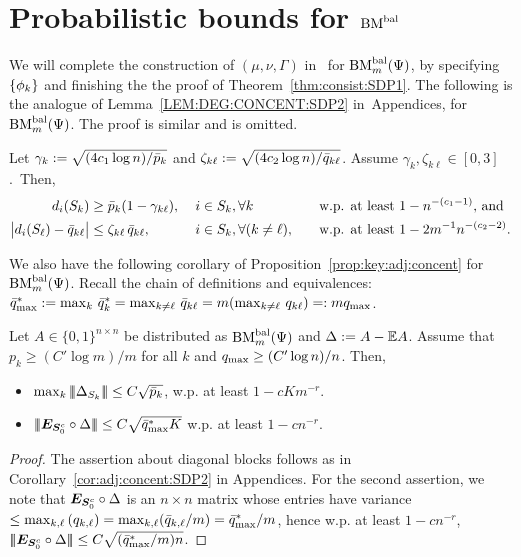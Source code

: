 
\section{Probabilistic bounds for $\textrm{BM}^{\textrm{bal}}$}\label{sec:prob:cond:bm}
  We will complete the construction of $(\mu,\nu,\Gamma)$ in~ for $\textrm{BM}^{\textrm{bal}}_m(\Psi)$, by specifying $\{\phi_k\}$ and finishing the the proof of Theorem~\ref{thm:consist:SDP1}. The following is the analogue of Lemma~\ref{LEM:DEG:CONCENT:SDP2} in~Appendices, for $\textrm{BM}^{\textrm{bal}}_m(\Psi)$. The proof is similar and is omitted.
  \begin{lem}\label{lem:deg:concent:SDP1}
  Let $\gamma_k := \sqrt{ (4c_1 \log n)/ \bar{p}_k}$ and $\zeta_{k \ell} := \sqrt{ (4c_2 \log n)/ \bar{q}_{k\ell}}$. Assume $\gamma_k,\zeta_{k \ell} \in [0,3]$.~Then,
  \begin{alignat*}{4}
    d_{i}(S_{k}) &\ge \bar{p}_k(1-\gamma_{k \ell}), 
      &&\; i \in S_{k}, \forall k
      && \quad \text{w.p. at least $1 - n^{-(c_1-1)}$, and} \\
    \big| d_{i}(S_{\ell}) - \bar{q}_{k\ell} \big| &\le \zeta_{k\ell} \, \bar{q}_{k\ell}, 
      &&\; i \in S_{k}, \forall (k \neq \ell),   
      &&\quad \text{w.p. at least $1-2 m^{-1}n^{-(c_2-2)}$}.
  \end{alignat*}
  \end{lem}

  We also have the following corollary of Proposition~\ref{prop:key:adj:concent} for $\textrm{BM}^{\textrm{bal}}_m(\Psi)$. Recall the chain of definitions and equivalences:
   $ \bar{q}^{*}_{\max} := \max_k \,\bar{q}^*_k = \max_{k \neq \ell} \,\bar{q}_{k \ell} = m (\max_{k \neq \ell} \, q_{k \ell} ) =: m q_{\max}$.

  \begin{cor}\label{cor:adj:concent:SDP1}
  Let $A \in \{0,1\}^{n \times n}$ be distributed as $\textrm{BM}^{\textrm{bal}}_m(\Psi)$ and $\Delta := A - \mathbb{E} A$. Assume that $p_k \ge (C' \log m) / m$ for all $k$ and $q_{\max} \ge (C' \log n)/ n$. Then, 
  \begin{itemize}
    \item $\max_k |\!|\!|\Delta_{S_{k}}|\!|\!| \le C \sqrt{\bar{p}_k}$, w.p. at least $1- c K m^{-r}$. 
    \item $|\!|\!|\bm{E}_{\bm{S}_0^c} \circ \Delta|\!|\!| \le C \sqrt{\bar{q}^{*}_{\max} K}$ w.p. at least $1-c n^{-r}$.
  \end{itemize}
  \end{cor}
  \begin{proof}
    The assertion about diagonal blocks follows as in Corollary~\ref{cor:adj:concent:SDP2} in Appendices. 
    For the second assertion, we note that $\bm{E}_{\bm{S}_0^c} \circ \Delta$
    is an $n \times n$ matrix whose entries have variance $\le \max_{k,\ell} \,(q_{k,\ell}) = \max_{k,\ell} (\bar{q}_{k,\ell}/m) =  \bar{q}^{*}_{\max} / m$, hence  w.p. at least $1-cn^{-r}$,  $|\!|\!|\bm{E}_{\bm{S}_0^c} \circ \Delta|\!|\!| \le C \sqrt{(\bar{q}^{*}_{\max}/m) n}$. 
  \end{proof}


